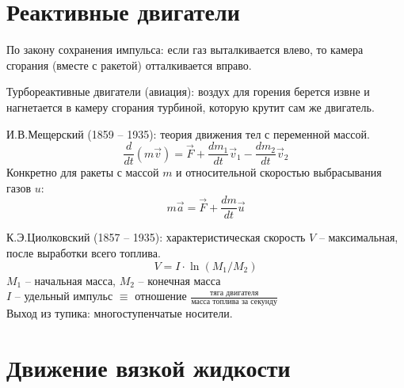   \section{Реактивные двигатели}

  По закону сохранения импульса: если газ выталкивается влево, то камера сгорания (вместе с ракетой) отталкивается вправо.

  Турбореактивные двигатели (авиация): воздух для горения берется извне и нагнетается в камеру сгорания турбиной, которую крутит сам же двигатель.

  И.В.Мещерский (1859 -- 1935): теория движения тел с переменной массой.\vspace{-3mm}
  \begin{displaymath}
  \frac d{dt}(m\vec{v})=\vec{F}+\frac{dm_1}{dt}\vec{v}_1-\frac{dm_2}{dt}\vec{v}_2
  \end{displaymath}
  Конкретно для ракеты с массой $m$ и относительной скоростью выбрасывания газов $u$:\vspace{-3mm}
  \begin{displaymath}
  m\vec{a}=\vec{F}+\frac{dm}{dt}\vec{u}
  \end{displaymath}

  К.Э.Циолковский (1857 -- 1935): характеристическая скорость $V$ -- максимальная, после выработки всего топлива.
  \begin{displaymath}
  V=I\cdot\ln\left({M_1}/{M_2}\right)
  \end{displaymath}
  $M_1$ -- начальная масса, \hspace{10mm}$M_2$ -- конечная масса\\
  $I$ -- удельный импульс $\equiv$ отношение $\frac{\texttt{тяга двигателя}}{\texttt{масса топлива за секунду}}$\\
  Выход из тупика: многоступенчатые носители.\\

\section{Движение вязкой жидкости}

